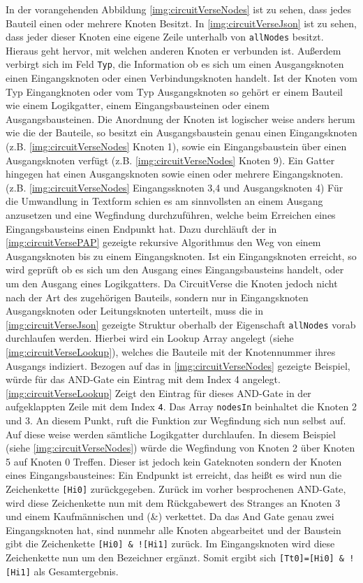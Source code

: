  
 In der vorangehenden Abbildung \ref{img:circuitVerseNodes} ist zu sehen, dass jedes Bauteil einen oder mehrere Knoten Besitzt. In \autoref{img:circuitVerseJson} ist zu sehen, dass jeder dieser Knoten eine eigene Zeile unterhalb von \texttt{allNodes} besitzt. Hieraus geht hervor, mit welchen anderen Knoten er verbunden ist. Außerdem verbirgt sich im Feld \texttt{Typ}, die Information ob es sich um einen Ausgangsknoten einen Eingangsknoten oder einen Verbindungsknoten handelt. Ist der Knoten vom Typ Eingangknoten oder vom Typ Ausgangsknoten so gehört er einem Bauteil wie einem Logikgatter, einem Eingangsbausteinen oder einem Ausgangsbausteinen. Die Anordnung der Knoten ist logischer weise anders herum wie die der Bauteile, so besitzt ein Ausgangsbaustein genau einen Eingangsknoten (z.B.  \ref{img:circuitVerseNodes} Knoten 1), sowie ein Eingangsbaustein über einen Ausgangsknoten verfügt (z.B. \autoref{img:circuitVerseNodes} Knoten 9). Ein Gatter hingegen hat einen Ausgangsknoten sowie einen oder mehrere Eingangsknoten. (z.B. \autoref{img:circuitVerseNodes} Eingangssknoten 3,4 und Ausgangsknoten 4) Für die Umwandlung in Textform schien es am sinnvollsten an einem Ausgang anzusetzen und eine Wegfindung durchzuführen, welche beim Erreichen eines Eingangsbausteins einen Endpunkt hat. Dazu durchläuft der in \autoref{img:circuitVersePAP} gezeigte rekursive Algorithmus den Weg von einem Ausgangsknoten bis zu einem Eingangsknoten. Ist ein Eingangsknoten erreicht, so wird geprüft ob es sich um den Ausgang eines Eingangsbausteins handelt, oder um den Ausgang eines Logikgatters. Da CircuitVerse die Knoten jedoch nicht nach der Art des zugehörigen Bauteils, sondern nur in Eingangsknoten Ausgangsknoten oder Leitungsknoten unterteilt, muss die in \ref{img:circuitVerseJson} gezeigte Struktur oberhalb der Eigenschaft \texttt{allNodes} vorab durchlaufen werden. Hierbei wird ein Lookup Array angelegt (siehe \autoref{img:circuitVerseLookup}), welches die Bauteile mit der Knotennummer ihres Ausgangs indiziert. Bezogen auf das in \autoref{img:circuitVerseNodes} gezeigte Beispiel, würde für das AND-Gate ein Eintrag mit dem Index 4 angelegt. \autoref{img:circuitVerseLookup} Zeigt den Eintrag für dieses AND-Gate in der aufgeklappten Zeile mit dem Index \texttt{4}. Das Array \texttt{nodesIn} beinhaltet die Knoten 2 und 3. An diesem Punkt, ruft die Funktion zur Wegfindung sich nun selbst auf. Auf diese weise werden sämtliche Logikgatter durchlaufen. In diesem Beispiel (siehe \autoref{img:circuitVerseNodes}) würde die Wegfindung von Knoten 2 über Knoten 5 auf Knoten 0 Treffen. Dieser ist jedoch kein Gateknoten sondern der Knoten eines Eingangsbausteines: Ein Endpunkt ist erreicht, das heißt es wird nun die Zeichenkette \texttt{[Hi0]} zurückgegeben. Zurück im vorher besprochenen AND-Gate, wird diese Zeichenkette nun mit dem Rückgabewert des Stranges an Knoten 3 und einem Kaufmännischen und (\&) verkettet. Da das And Gate genau zwei Eingangsknoten hat, sind nunmehr alle Knoten abgearbeitet und der Baustein gibt die Zeichenkette \texttt{[Hi0] \& ![Hi1]} zurück. Im Eingangsknoten wird diese Zeichenkette nun um den Bezeichner ergänzt.  Somit ergibt sich \texttt{[Tt0]=[Hi0] \& ![Hi1]} als Gesamtergebnis. 

